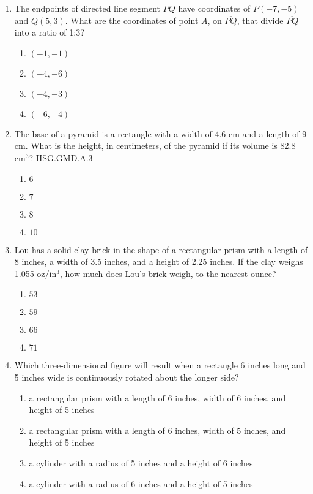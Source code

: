 \begin{enumerate}
\item The endpoints of directed line segment $PQ$ have coordinates of $P(-7,-5)$ and $Q(5,3)$. What are the coordinates of point $A$, on $\overline{PQ}$, that divide $\overline{PQ}$ into a ratio of 1:3?
\begin{multicols}{2}
  \begin{enumerate}
    \item $(-1,-1)$
    \item $(-4,-6)$
    \item $(-4,-3)$
    \item $(-6,-4)$
  \end{enumerate}
  \end{multicols} \vspace{2cm}

\item The base of a pyramid is a rectangle with a width of 4.6 cm and a length of 9 cm. What is the height, in centimeters, of the pyramid if its volume is 82.8 cm$^3$? \hfill HSG.GMD.A.3
\begin{multicols}{2}
  \begin{enumerate}
    \item $6$
    \item $7$
    \item $8$
    \item $10$
  \end{enumerate}
  \end{multicols} \vspace{0.5cm}

\item Lou has a solid clay brick in the shape of a rectangular prism with a length of 8 inches, a width of 3.5 inches, and a height of 2.25 inches. If the clay weighs 1.055 oz/in$^3$, how much does Lou's brick weigh, to the nearest ounce? 
\begin{multicols}{2}
  \begin{enumerate}
  \item $53$
  \item $59$
  \item $66$
  \item $71$
\end{enumerate}
\end{multicols} \vspace{2.5cm}

\newpage
\item Which three-dimensional figure will result when a rectangle 6 inches long and 5 inches wide is continuously rotated about the longer side?
\begin{enumerate}
  \item a rectangular prism with a length of 6 inches, width of 6 inches, and height of 5 inches
  \item a rectangular prism with a length of 6 inches, width of 5 inches, and height of 5 inches
  \item a cylinder with a radius of 5 inches and a height of 6 inches
  \item a cylinder with a radius of 6 inches and a height of 5 inches
\end{enumerate}


\end{enumerate}
